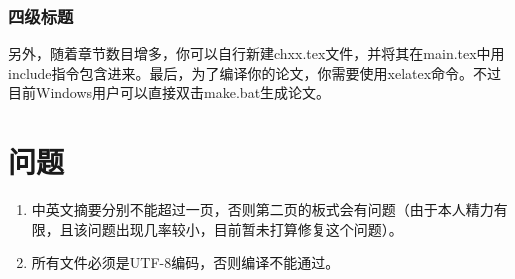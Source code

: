 \subsubsection{四级标题}
另外，随着章节数目增多，你可以自行新建chxx.tex文件，并将其在main.tex中用include指令包含进来。最后，为了编译你的论文，你需要使用xelatex命令。不过目前Windows用户可以直接双击make.bat生成论文。

\section{问题}
\begin{enumerate}
\item 中英文摘要分别不能超过一页，否则第二页的板式会有问题（由于本人精力有限，且该问题出现几率较小，目前暂未打算修复这个问题）。
\item 所有文件必须是UTF-8编码，否则编译不能通过。
\end{enumerate}